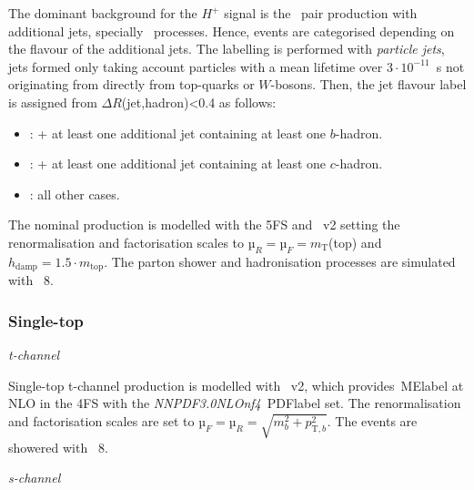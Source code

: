 The dominant background for the $H^+$ signal is the \ttbar\ pair production with additional jets, specially \ttb\ processes. Hence, events are categorised depending on the flavour of the additional jets. The labelling is performed with \textit{particle jets}, jets formed only taking account particles with a mean lifetime over $3\cdot10^{-11}$~s not originating from directly from top-quarks or $W$-bosons. Then, the jet flavour label is assigned from $\Delta R$(jet,hadron)<0.4 as follows:
\begin{itemize}
    \item \ttb: \ttbar + at least one additional jet containing at least one $b$-hadron.
    \item \ttc: \ttbar + at least one additional jet containing at least one $c$-hadron.
    \item \ttl: all other cases.
\end{itemize}

The nominal production is modelled with the 5FS and \POWHEGBOX~v2 setting the renormalisation and factorisation scales to $µ_R = µ_F = m_\text{T}$(top) and $h_\text{damp}=1.5\cdot m_\text{top}$. The parton shower and hadronisation processes are simulated with \PYTHIA~8.

\subsubsection{Single-top}
\textit{t-channel}

Single-top t-channel production is modelled with \POWHEGBOX~v2, which provides~\acrshort{MElabel} at NLO in the 4FS with the \textit{NNPDF3.0NLOnf4}~\acrshort{PDFlabel} set. The renormalisation and factorisation scales are set to $µ_F=µ_R=\sqrt{m_b^2+p_{\text{T},b}^2}$. The events are showered with \PYTHIA~8.

\textit{s-channel}

